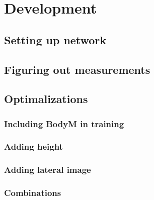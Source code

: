 \chapter{Development}

\section{Setting up network}
\section{Figuring out measurements}
\section{Optimalizations}
\subsection{Including BodyM in training}
\subsection{Adding height}
\subsection{Adding lateral image}
\subsection{Combinations}

